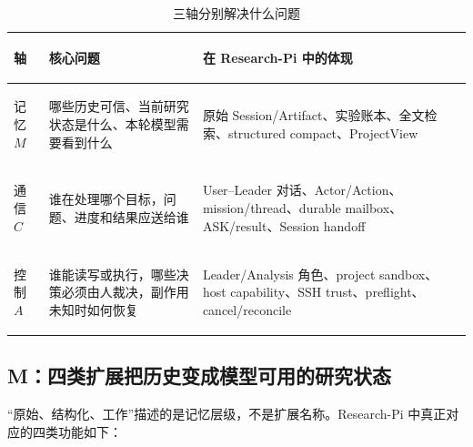 \documentclass[UTF8,11pt,a4paper,fontset=fandol]{ctexart}
\begin{document}
\begin{table}[H]
  \centering
  \caption{三轴分别解决什么问题}
  \small
  \begin{tabularx}{\textwidth}{>{\bfseries\raggedright\arraybackslash}p{1.7cm}p{4.1cm}Y}
    \toprule
    轴 & 核心问题 & 在 Research-Pi 中的体现 \\
    \midrule
    记忆 $M$ & 哪些历史可信、当前研究状态是什么、本轮模型需要看到什么 & 原始 Session/Artifact、实验账本、全文检索、structured compact、ProjectView \\
    通信 $C$ & 谁在处理哪个目标，问题、进度和结果应送给谁 & User--Leader 对话、Actor/Action、mission/thread、durable mailbox、ASK/result、Session handoff \\
    控制 $A$ & 谁能读写或执行，哪些决策必须由人裁决，副作用未知时如何恢复 & Leader/Analysis 角色、project sandbox、host capability、SSH trust、preflight、cancel/reconcile \\
    \bottomrule
  \end{tabularx}
\end{table}

\subsection{M：四类扩展把历史变成模型可用的研究状态}

“原始、结构化、工作”描述的是记忆层级，不是扩展名称。Research-Pi 中真正对应的四类功能如下：
\end{document}
